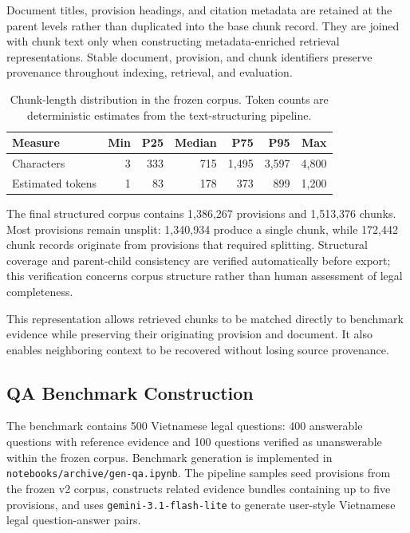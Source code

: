 Document titles, provision headings, and citation metadata are retained at the parent levels rather than duplicated into the base chunk record. They are joined with chunk text only when constructing metadata-enriched retrieval representations. Stable document, provision, and chunk identifiers preserve provenance throughout indexing, retrieval, and evaluation.

\begin{table}[t]
\centering
\scriptsize
\caption{Chunk-length distribution in the frozen corpus. Token counts are deterministic estimates from the text-structuring pipeline.}
\label{tab:chunk-length-distribution}
\begin{tabular}{@{}lrrrrrr@{}}
\toprule
\textbf{Measure} & \textbf{Min} & \textbf{P25} & \textbf{Median} & \textbf{P75} & \textbf{P95} & \textbf{Max} \\
\midrule
Characters & 3 & 333 & 715 & 1,495 & 3,597 & 4,800 \\
Estimated tokens & 1 & 83 & 178 & 373 & 899 & 1,200 \\
\bottomrule
\end{tabular}
\end{table}

The final structured corpus contains 1,386,267 provisions and 1,513,376 chunks. Most provisions remain unsplit: 1,340,934 produce a single chunk, while 172,442 chunk records originate from provisions that required splitting. Structural coverage and parent-child consistency are verified automatically before export; this verification concerns corpus structure rather than human assessment of legal completeness.

This representation allows retrieved chunks to be matched directly to benchmark evidence while preserving their originating provision and document. It also enables neighboring context to be recovered without losing source provenance.
\subsection{QA Benchmark Construction}
\label{sec:benchmark-construction}

The benchmark contains 500 Vietnamese legal questions: 400 answerable questions with reference evidence and 100 questions verified as unanswerable within the frozen corpus. Benchmark generation is implemented in \texttt{notebooks/archive/gen-qa.ipynb}. The pipeline samples seed provisions from the frozen v2 corpus, constructs related evidence bundles containing up to five provisions, and uses \texttt{gemini-3.1-flash-lite} to generate user-style Vietnamese legal question-answer pairs.

